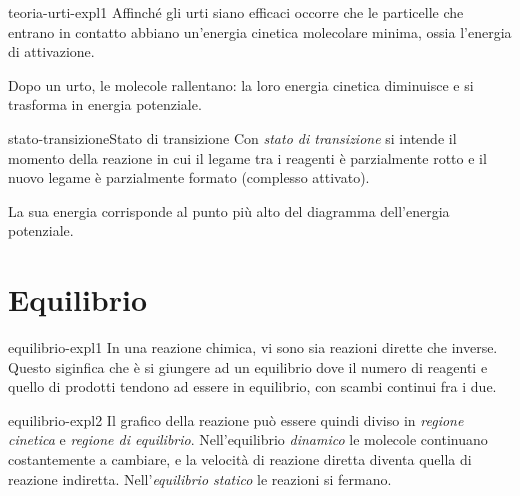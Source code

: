\documentclass[preview]{standalone}
\begin{document}

\begin{snippet}{teoria-urti-expl1}
    Affinché gli urti siano efficaci occorre che le particelle che
    entrano in contatto abbiano un'energia cinetica molecolare
    minima, ossia l'energia di attivazione.

    Dopo un urto, le molecole rallentano: la loro energia
    cinetica diminuisce e si trasforma in energia potenziale.
\end{snippet}

\begin{snippetdefinition}{stato-transizione}{Stato di transizione}
    Con \textit{stato di transizione} si intende
    il momento della reazione in cui il
    legame tra i reagenti è parzialmente rotto e il nuovo
    legame è parzialmente formato (complesso attivato).
\end{snippetdefinition}

\begin{plainhtml}
    La sua energia corrisponde al punto più alto del diagramma dell'energia potenziale.
\end{plainhtml}


\section{Equilibrio}

\begin{snippet}{equilibrio-expl1}
    In una reazione chimica, vi sono sia reazioni dirette che inverse.
    Questo siginfica che è si giungere ad un equilibrio dove
    il numero di reagenti e quello di prodotti tendono ad essere in equilibrio,
    con scambi continui fra i due.
\end{snippet}


\begin{snippet}{equilibrio-expl2}
    Il grafico della reazione può essere quindi diviso in \textit{regione cinetica}
    e \textit{regione di equilibrio}. 
    Nell'equilibrio \textit{dinamico} le molecole continuano costantemente a
    cambiare, e la velocità di reazione diretta diventa quella di reazione indiretta.
    Nell'\textit{equilibrio statico} le reazioni si fermano.
\end{snippet}
\end{document}
